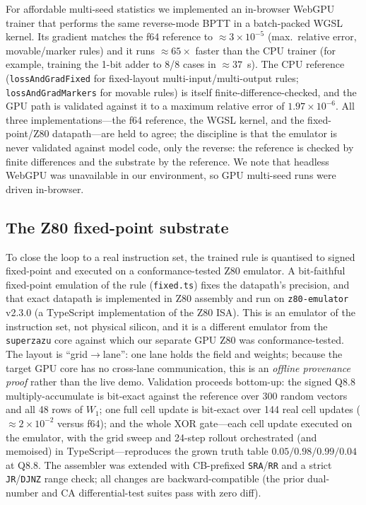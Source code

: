 For affordable multi-seed statistics we implemented an in-browser WebGPU trainer that performs the same reverse-mode BPTT in a batch-packed WGSL kernel. Its gradient matches the f64 reference to $\approx 3\times10^{-5}$ (max.\ relative error, movable/marker rules) and it runs $\approx 65\times$ faster than the CPU trainer (for example, training the 1-bit adder to 8/8 cases in $\approx37$~s). The CPU reference (\texttt{lossAndGradFixed} for fixed-layout multi-input/multi-output rules; \texttt{lossAndGradMarkers} for movable rules) is itself finite-difference-checked, and the GPU path is validated against it to a maximum relative error of $1.97\times10^{-6}$. All three implementations---the f64 reference, the WGSL kernel, and the fixed-point/Z80 datapath---are held to agree; the discipline is that the emulator is never validated against model code, only the reverse: the reference is checked by finite differences and the substrate by the reference. We note that headless WebGPU was unavailable in our environment, so GPU multi-seed runs were driven in-browser.

\subsection*{The Z80 fixed-point substrate}

To close the loop to a real instruction set, the trained rule is quantised to signed fixed-point and executed on a conformance-tested Z80 emulator. A bit-faithful fixed-point emulation of the rule (\texttt{fixed.ts}) fixes the datapath's precision, and that exact datapath is implemented in Z80 assembly and run on \texttt{z80-emulator} v2.3.0 (a TypeScript implementation of the Z80 ISA). This is an emulator of the instruction set, not physical silicon, and it is a different emulator from the \texttt{superzazu} core against which our separate GPU Z80 was conformance-tested. The layout is ``grid$\to$lane'': one lane holds the field and weights; because the target GPU core has no cross-lane communication, this is an \emph{offline provenance proof} rather than the live demo. Validation proceeds bottom-up: the signed Q8.8 multiply-accumulate is bit-exact against the reference over 300 random vectors and all 48 rows of $W_1$; one full cell update is bit-exact over 144 real cell updates ($\approx2\times10^{-2}$ versus f64); and the whole XOR gate---each cell update executed on the emulator, with the grid sweep and 24-step rollout orchestrated (and memoised) in TypeScript---reproduces the grown truth table $0.05/0.98/0.99/0.04$ at Q8.8. The assembler was extended with CB-prefixed \texttt{SRA}/\texttt{RR} and a strict \texttt{JR}/\texttt{DJNZ} range check; all changes are backward-compatible (the prior dual-number and CA differential-test suites pass with zero diff).

